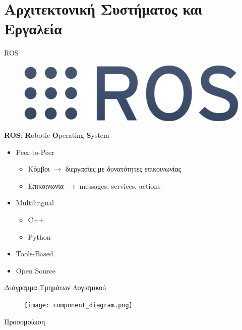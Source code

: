 \documentclass[10pt, compress, handout]{beamer} %
\begin{document}
\section{Αρχιτεκτονική Συστήματος και Εργαλεία}

\begin{frame}{ROS}
	\begin{figure}
		\includegraphics[width=0.4\linewidth]{Figures/ros.png}
	\end{figure}
	\textbf{ROS}: \textbf{R}obotic \textbf{O}perating \textbf{S}ystem
	\begin{itemize}
		\item Peer-to-Peer
			\begin{itemize}
				\item Κόμβοι $\rightarrow$ διεργασίες με δυνατότητες επικοινωνίας
				\item Επικοινωνία $\rightarrow$ messages, services, actions
			\end{itemize}
		\item Multilingual
			\begin{itemize}
				\item C++
				\item Python
			\end{itemize}
		\item Tools-Based
		\item Open Source
	\end{itemize}
\end{frame}

\begin{frame}{Διάγραμμα Τμημάτων Λογισμικού}
	\begin{figure}
		\texttt{[image: component\_diagram.png]}
	\end{figure}
\end{frame}

\begin{frame}{Προσομοίωση}	
	\begin{figure}
	\end{figure}
\end{frame}
\end{document}
